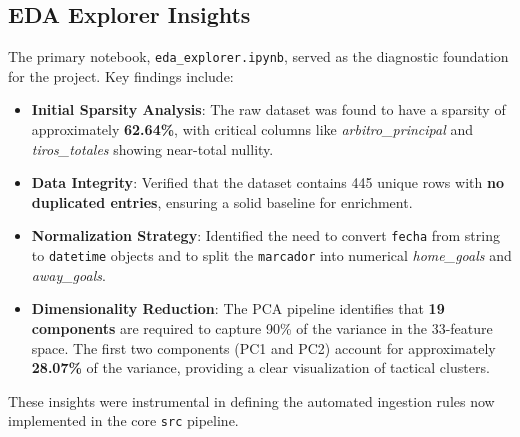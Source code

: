 \documentclass[12pt,a4paper]{article}
\begin{document}
\subsection{EDA Explorer Insights}
The primary notebook, \texttt{eda\_explorer.ipynb}, served as the diagnostic foundation for the project. Key findings include:
\begin{itemize}
    \item \textbf{Initial Sparsity Analysis}: The raw dataset was found to have a sparsity of approximately \textbf{62.64\%}, with critical columns like \textit{arbitro\_principal} and \textit{tiros\_totales} showing near-total nullity.
    \item \textbf{Data Integrity}: Verified that the dataset contains 445 unique rows with \textbf{no duplicated entries}, ensuring a solid baseline for enrichment.
    \item \textbf{Normalization Strategy}: Identified the need to convert \texttt{fecha} from string to \texttt{datetime} objects and to split the \texttt{marcador} into numerical \textit{home\_goals} and \textit{away\_goals}.
    \item \textbf{Dimensionality Reduction}: The PCA pipeline identifies that \textbf{19 components} are required to capture 90\% of the variance in the 33-feature space. The first two components (PC1 and PC2) account for approximately \textbf{28.07\%} of the variance, providing a clear visualization of tactical clusters.
\end{itemize}
These insights were instrumental in defining the automated ingestion rules now implemented in the core \texttt{src} pipeline.

\appendix
\end{document}

